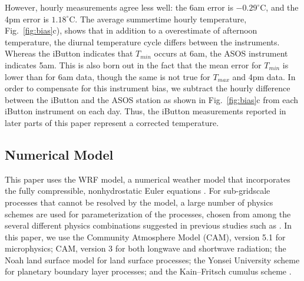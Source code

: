 \documentclass[draft,linenumbers]{agujournal}
\begin{document}
However, hourly measurements agree less well: the 6am error is $-0.29^\circ$C, and the 4pm error is $1.18^\circ$C. The average summertime hourly temperature, Fig.~\ref{fig:bias}c), shows that in addition to a overestimate of afternoon temperature, the diurnal temperature cycle differs between the instruments. Whereas the iButton indicates that $T_{min}$ occurs at 6am, the ASOS instrument indicates 5am. This is also born out in the fact that the mean error for $T_{min}$ is lower than for 6am data, though the same is not true for $T_{max}$ and 4pm data. In order to compensate for this instrument bias, we subtract the hourly difference between the iButton and the ASOS station as shown in Fig.~\ref{fig:bias}c from each iButton instrument on each day. Thus, the iButton measurements reported in later parts of this paper represent a corrected temperature.  

\subsection{Numerical Model} 
\label{sec:methods_model}
This paper uses the WRF model, a numerical weather model that incorporates the fully
compressible, nonhydrostatic Euler equations \cite{skamarock2008description}. %
For sub-gridscale processes that cannot be resolved by the model, a large number of physics schemes are 
used for parameterization of the processes, chosen from among the
several different physics combinations suggested in
previous studies such as \cite{argueso2011evaluation, giannakopoulou2012persian, efstathiou2013sensitivity, zittis2014comparison}. %
In this paper, we use the
Community Atmosphere Model (CAM), version 5.1 \citep{neale2010description} %
for microphysics; CAM, version 3 \citep{collins2004description} %
for both longwave and shortwave radiation;
the Noah land surface model \citep{ek2003implementation} %
for land surface processes; 
the Yonsei University scheme \citep{hong2006new} %
for planetary boundary layer processes;
and the Kain–Fritsch cumulus scheme \citep{kain1990one}. %
\end{document}
